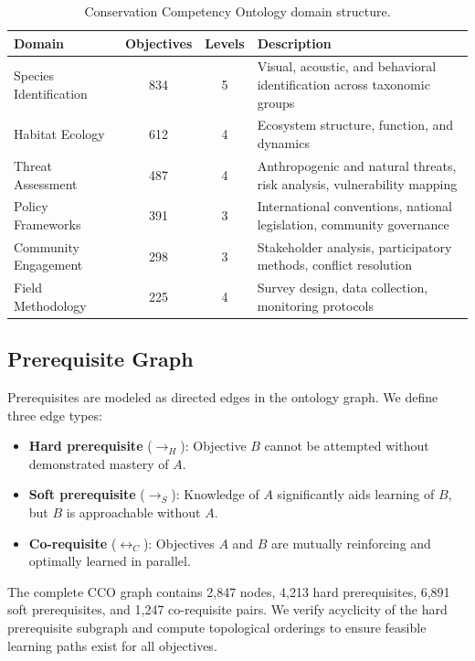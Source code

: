 \begin{table}[H]
\centering
\caption{Conservation Competency Ontology domain structure.}
\label{tab:cco_domains}
\begin{tabularx}{\textwidth}{@{}lccX@{}}
\toprule
\textbf{Domain} & \textbf{Objectives} & \textbf{Levels} & \textbf{Description} \\
\midrule
Species Identification & 834 & 5 & Visual, acoustic, and behavioral identification across taxonomic groups \\
Habitat Ecology & 612 & 4 & Ecosystem structure, function, and dynamics \\
Threat Assessment & 487 & 4 & Anthropogenic and natural threats, risk analysis, vulnerability mapping \\
Policy Frameworks & 391 & 3 & International conventions, national legislation, community governance \\
Community Engagement & 298 & 3 & Stakeholder analysis, participatory methods, conflict resolution \\
Field Methodology & 225 & 4 & Survey design, data collection, monitoring protocols \\
\bottomrule
\end{tabularx}
\end{table}

\subsection{Prerequisite Graph}

Prerequisites are modeled as directed edges in the ontology graph.
We define three edge types:

\begin{itemize}[leftmargin=*]
    \item \textbf{Hard prerequisite} ($\rightarrow_H$): Objective $B$ cannot be attempted without demonstrated mastery of $A$.
    \item \textbf{Soft prerequisite} ($\rightarrow_S$): Knowledge of $A$ significantly aids learning of $B$, but $B$ is approachable without $A$.
    \item \textbf{Co-requisite} ($\leftrightarrow_C$): Objectives $A$ and $B$ are mutually reinforcing and optimally learned in parallel.
\end{itemize}

The complete CCO graph contains 2,847 nodes, 4,213 hard prerequisites, 6,891 soft prerequisites, and 1,247 co-requisite pairs.
We verify acyclicity of the hard prerequisite subgraph and compute topological orderings to ensure feasible learning paths exist for all objectives.

